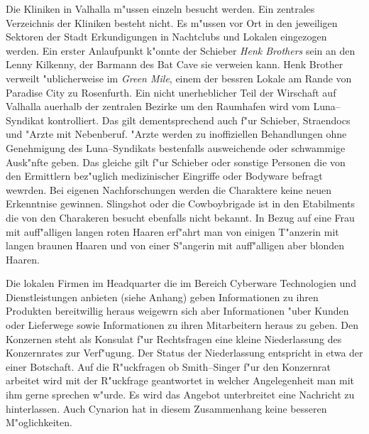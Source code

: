 Die Kliniken in Valhalla m"ussen einzeln besucht werden. Ein zentrales Verzeichnis der Kliniken besteht nicht. Es m"ussen vor Ort in den jeweiligen Sektoren der Stadt Erkundigungen in Nachtclubs und Lokalen eingezogen werden. Ein erster Anlaufpunkt k"onnte der Schieber \emph{Henk Brothers} sein an den Lenny Kilkenny, der Barmann des Bat Cave sie verwei\3en kann. Henk Brother verweilt "ublicherweise im \emph{Green Mile}, einem der bessren Lokale am Rande von Paradise City zu Rosenfurth. Ein nicht unerheblicher Teil der Wirschaft auf Valhalla au\3erhalb der zentralen Bezirke um den Raumhafen wird vom Luna--Syndikat kontrolliert. Das gilt dementsprechend auch f"ur Schieber, Stra\3endocs und "Arzte mit Nebenberuf. "Arzte werden zu inoffiziellen Behandlungen ohne Genehmigung des Luna--Syndikats bestenfalls ausweichende oder schwammige Ausk"nfte geben. Das gleiche gilt f"ur Schieber oder sonstige Personen die von den Ermittlern bez"uglich medizinischer Eingriffe oder Bodyware befragt wewrden. Bei eigenen Nachforschungen werden die Charaktere keine neuen Erkenntnise gewinnen. Slingshot oder die Cowboybrigade ist in den Etabilments die von den Charakeren besucht ebenfalls  nicht bekannt. In Bezug auf eine Frau mit auff"alligen langen roten Haaren erf"ahrt man von einigen T"anzerin mit langen braunen Haaren und von einer S"angerin mit auff"alligen aber blonden Haaren.

Die lokalen Firmen im Headquarter die im Bereich Cyberware Technologien und Dienstleistungen anbieten (siehe Anhang) geben Informationen zu ihren Produkten bereitwillig heraus weigewrn sich aber Informationen "uber Kunden oder Lieferwege sowie Informationen zu ihren Mitarbeitern heraus zu geben. Den Konzernen steht als Konsulat f"ur Rechtsfragen eine kleine Niederlassung des Konzernrates zur Verf"ugung. Der Status der Niederlassung entspricht in etwa der einer Botschaft. Auf die R"uckfragen ob Smith--Singer f"ur den Konzernrat arbeitet wird mit der R"uckfrage geantwortet in welcher Angelegenheit man mit ihm gerne sprechen w"urde. Es wird das Angebot unterbreitet eine Nachricht zu hinterlassen. Auch Cynarion hat in diesem Zusammenhang keine besseren M"oglichkeiten.

